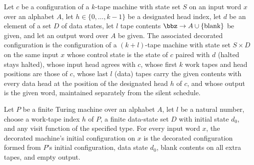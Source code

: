 \begin{definition}
\label{Complexity.decoratedCfg}
\leanok
{}
Let $c$ be a configuration of a $k$-tape machine with state set $S$ on an input word
$x$ over an alphabet $A$, let $h \in \{0, \dots, k-1\}$ be a designated head index,
let $d$ be an element of a set $D$ of data states, let $l$ tape contents
$\bbz \to A \cup \{\text{blank}\}$ be given, and let an output word over $A$ be given.
The associated decorated configuration is the configuration of a $(k+l)$-tape machine
with state set $S \times D$ on the same input $x$ whose control state is the state of
$c$ paired with $d$ (halted stays halted), whose input head agrees with $c$, whose
first $k$ work tapes and head positions are those of $c$, whose last $l$ (data) tapes
carry the given contents with every data head at the position of the designated head
$h$ of $c$, and whose output is the given word, maintained separately from the silent
schedule.
\end{definition}

\begin{lemma}
\label{Complexity.decoratedCfg_init}
\leanok
{}
Let $P$ be a finite Turing machine over an alphabet $A$, let $l$ be a natural number,
choose a work-tape index $h$ of $P$, a finite data-state set $D$ with initial state
$d_0$, and any visit function of the specified type. For every input word $x$, the
decorated machine's initial configuration on $x$ is the decorated configuration formed
from $P$'s initial configuration, data state $d_0$, blank contents on all extra tapes,
and empty output.
\end{lemma}


